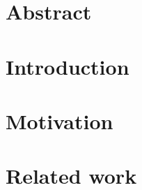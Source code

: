 \documentclass[a4paper,10pt]{article}
\author{\me}
\begin{document}


\normalsize


%

%

\section*{Abstract}\label{chapter:abstract}


%


\newpage
\section{Introduction}\label{chapter:introduction}
\setcounter{page}{0}


\section{Motivation}\label{chapter:motivation}


\section{Related work}\label{chapter:related_work}

\end{document}

